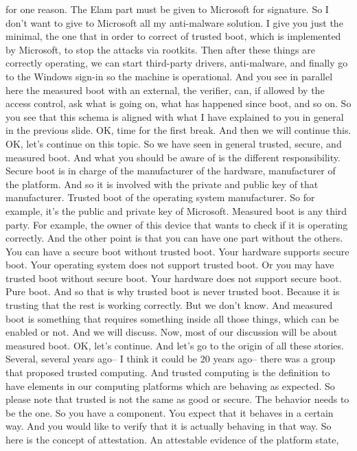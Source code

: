  for one reason. The Elam part must be given to Microsoft for signature. So I
 don't want to give to Microsoft all my anti-malware solution. I give you just
 the minimal, the one that in order to correct of trusted boot, which is
 implemented by Microsoft, to stop the attacks via rootkits. Then after these
 things are correctly operating, we can start third-party drivers,
 anti-malware, and finally go to the Windows sign-in so the machine is
 operational. And you see in parallel here the measured boot with an external,
 the verifier, can, if allowed by the access control, ask what is going on,
 what has happened since boot, and so on. So you see that this schema is
 aligned with what I have explained to you in general in the previous slide.
 OK, time for the first break. And then we will continue this. OK, let's
 continue on this topic. So we have seen in general trusted, secure, and
 measured boot. And what you should be aware of is the different
 responsibility. Secure boot is in charge of the manufacturer of the hardware,
 manufacturer of the platform. And so it is involved with the private and
 public key of that manufacturer. Trusted boot of the operating system
 manufacturer. So for example, it's the public and private key of Microsoft.
 Measured boot is any third party. For example, the owner of this device that
 wants to check if it is operating correctly. And the other point is that you
 can have one part without the others. You can have a secure boot without
 trusted boot. Your hardware supports secure boot. Your operating system does
 not support trusted boot. Or you may have trusted boot without secure boot.
 Your hardware does not support secure boot. Pure boot. And so that is why
 trusted boot is never trusted boot. Because it is trusting that the rest is
 working correctly. But we don't know. And measured boot is something that
 requires something inside all those things, which can be enabled or not. And
 we will discuss. Now, most of our discussion will be about measured boot. OK,
 let's continue. And let's go to the origin of all these stories. Several,
 several years ago-- I think it could be 20 years ago-- there was a group that
 proposed trusted computing. And trusted computing is the definition to have
 elements in our computing platforms which are behaving as expected. So please
 note that trusted is not the same as good or secure. The behavior needs to be
 the one. So you have a component. You expect that it behaves in a certain way.
 And you would like to verify that it is actually behaving in that way. So here
 is the concept of attestation. An attestable evidence of the platform state,
